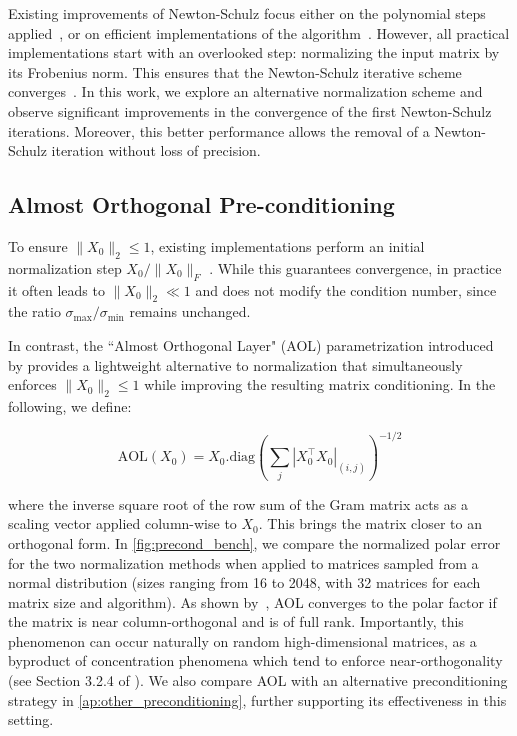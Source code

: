 Existing improvements of Newton-Schulz focus either on the polynomial steps applied~\cite{grishina_accelerating_2025, amsel2025polar}, or on efficient implementations of the algorithm~\cite{ahn_dion_2025}. However, all practical implementations start with an overlooked step: normalizing the input matrix by its Frobenius norm. This ensures that the Newton-Schulz iterative scheme converges~\cite{bjorck1971iterative}. In this work, we explore an alternative normalization scheme and observe significant improvements in the convergence of the first Newton-Schulz iterations. Moreover, this better performance allows the removal of a Newton-Schulz iteration without loss of precision.


\subsection{Almost Orthogonal Pre-conditioning}\label{ssec:AOLprecond}

To ensure $\|X_0\|_2\leq 1$, existing implementations perform an initial normalization step 
$X_0/\|X_0\|_F$
. While this guarantees convergence, in practice it often leads to $\|X_0\|_2\ll 1$ and does not modify the condition number, since the ratio $\sigma_{\max} / \sigma_{\min}$ remains unchanged.

In contrast, the ``Almost Orthogonal Layer" (AOL) parametrization introduced by \cite{prach2022almost} provides a lightweight alternative to normalization that simultaneously enforces $\|X_0\|_2\leq 1$ while improving the resulting matrix conditioning. In the following, we define: 

\begin{equation}
\text{AOL}(X_0) = X_0.\text{diag}\left(\sum_j |X_0^\top X_0|_{(i,j)}\right)^{-1/2} 
\label{eq:aol}
\end{equation}

where the inverse square root of the row sum of the Gram matrix acts as a scaling vector applied column-wise to $X_0$. This brings the matrix closer to an orthogonal form. In \cref{fig:precond_bench}, we compare the normalized polar error for the two normalization methods when applied to matrices sampled from a normal distribution (sizes ranging from 16 to 2048, with 32 matrices for each matrix size and algorithm).
As shown by~\cite{prach2022almost}, AOL converges to the polar factor if the matrix is near column-orthogonal and is of full rank. Importantly, this phenomenon can occur naturally on random high-dimensional matrices, as a byproduct of concentration phenomena which tend to enforce near-orthogonality (see Section 3.2.4 of \cite{vershynin2009high}). We also compare AOL with an alternative preconditioning strategy in \cref{ap:other_preconditioning}, further supporting its effectiveness in this setting.

